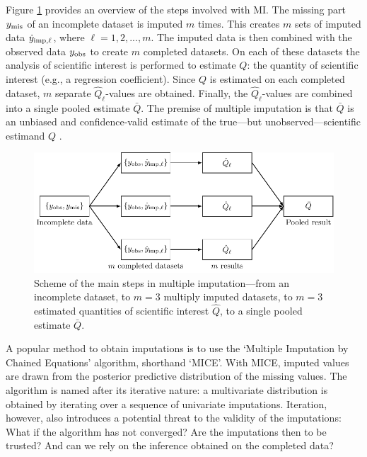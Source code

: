 \documentclass[Royal,times,sageh]{sagej}
\begin{document}
Figure \ref{fig:diagram} provides an overview of the steps involved with MI. The missing part \(y_{\rm mis}\) of an incomplete dataset is imputed \(m\) times. This creates \(m\) sets of imputed data \(\dot y_{\rm imp, \ell}\), where \(\ell = 1, 2, ..., m\). The imputed data is then combined with the observed data \(y_{\rm obs}\) to create \(m\) completed datasets. On each of these datasets the analysis of scientific interest is performed to estimate \(Q\): the quantity of scientific interest (e.g., a regression coefficient). Since \(Q\) is estimated on each completed dataset, \(m\) separate \(\hat{Q}_\ell\)-values are obtained. Finally, the \(\hat{Q}_\ell\)-values are combined into a single pooled estimate \(\bar{Q}\). The premise of multiple imputation is that \(\bar{Q}\) is an unbiased and confidence-valid estimate of the true---but unobserved---scientific estimand \(Q\) \citep{rubin96}.

\begin{figure}

{\centering \includegraphics[width=\linewidth]{../Figures/DiagramMI} 

}

\caption{Scheme of the main steps in multiple imputation---from an incomplete dataset, to $m=3$ multiply imputed datasets, to $m=3$ estimated quantities of scientific interest $\hat{Q}$, to a single pooled estimate $\bar{Q}$.}\label{fig:diagram}
\end{figure}

A popular method to obtain imputations is to use the `Multiple Imputation by Chained Equations' algorithm, shorthand `MICE'\citep{mice}. With MICE, imputed values are drawn from the posterior predictive distribution of the missing values. The algorithm is named after its iterative nature: a multivariate distribution is obtained by iterating over a sequence of univariate imputations. Iteration, however, also introduces a potential threat to the validity of the imputations: What if the algorithm has not converged? Are the imputations then to be trusted? And can we rely on the inference obtained on the completed data?
\end{document}
